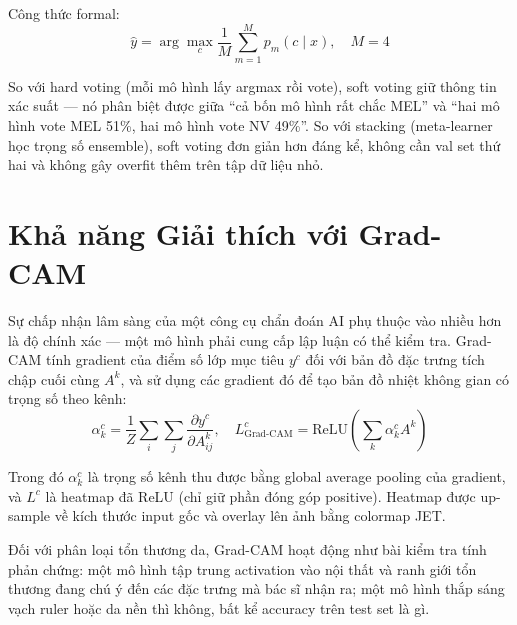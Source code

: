 Công thức formal:
\begin{equation}
\hat{y} = \arg\max_c \frac{1}{M} \sum_{m=1}^{M} p_m(c \mid x), \quad M = 4
\end{equation}

So với hard voting (mỗi mô hình lấy argmax rồi vote), soft voting giữ thông tin xác suất --- nó phân biệt được giữa ``cả bốn mô hình rất chắc MEL'' và ``hai mô hình vote MEL 51\%, hai mô hình vote NV 49\%''. So với stacking (meta-learner học trọng số ensemble), soft voting đơn giản hơn đáng kể, không cần val set thứ hai và không gây overfit thêm trên tập dữ liệu nhỏ.

\section{Khả năng Giải thích với Grad-CAM}

Sự chấp nhận lâm sàng của một công cụ chẩn đoán AI phụ thuộc vào nhiều hơn là độ chính xác --- một mô hình phải cung cấp lập luận có thể kiểm tra. Grad-CAM tính gradient của điểm số lớp mục tiêu $y^c$ đối với bản đồ đặc trưng tích chập cuối cùng $A^k$, và sử dụng các gradient đó để tạo bản đồ nhiệt không gian có trọng số theo kênh:
\begin{equation}
\alpha_k^c = \frac{1}{Z} \sum_i \sum_j \frac{\partial y^c}{\partial A_{ij}^k}, \quad L_{\text{Grad-CAM}}^c = \text{ReLU}\left(\sum_k \alpha_k^c A^k\right)
\end{equation}

Trong đó $\alpha_k^c$ là trọng số kênh thu được bằng global average pooling của gradient, và $L^c$ là heatmap đã ReLU (chỉ giữ phần đóng góp positive). Heatmap được up-sample về kích thước input gốc và overlay lên ảnh bằng colormap JET.

Đối với phân loại tổn thương da, Grad-CAM hoạt động như bài kiểm tra tính phản chứng: một mô hình tập trung activation vào nội thất và ranh giới tổn thương đang chú ý đến các đặc trưng mà bác sĩ nhận ra; một mô hình thắp sáng vạch ruler hoặc da nền thì không, bất kể accuracy trên test set là gì.
